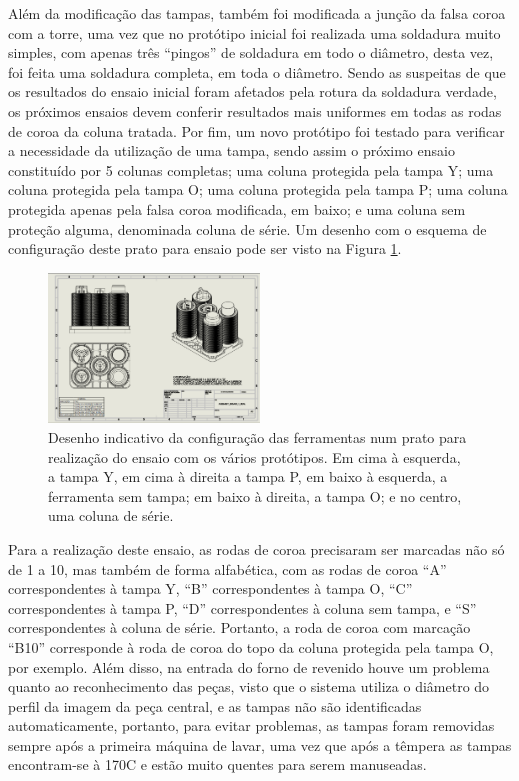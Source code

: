 \par
Além da modificação das tampas, também foi modificada a junção da falsa coroa com a torre, uma vez que no protótipo inicial foi realizada uma soldadura muito simples, com apenas três “pingos” de soldadura em todo o diâmetro, desta vez, foi feita uma soldadura completa, em toda o diâmetro. Sendo as suspeitas de que os resultados do ensaio inicial foram afetados pela rotura da soldadura verdade, os próximos ensaios devem conferir resultados mais uniformes em todas as rodas de coroa da coluna tratada. Por fim, um novo protótipo foi testado para verificar a necessidade da utilização de uma tampa, sendo assim o próximo ensaio constituído por 5 colunas completas; uma coluna protegida pela tampa Y; uma coluna protegida pela tampa O; uma coluna protegida pela tampa P; uma coluna protegida apenas pela falsa coroa modificada, em baixo; e uma coluna sem proteção alguma, denominada coluna de série. Um desenho com o esquema de configuração deste prato para ensaio pode ser visto na Figura \ref{fig:configuracao_ensaio}.
\begin{figure}[htb!]
    \centering
    \includegraphics[width = 0.5\textwidth]{Figures/Cap3/Esquema_Prato_Ensaio_08-05-2023.png}
    \caption[Desenho com a configuração do ensaio dos vários protótipos]%
    {Desenho indicativo da configuração das ferramentas num prato para realização do ensaio com os vários protótipos. Em cima à esquerda, a tampa Y, em cima à direita a tampa P, em baixo à esquerda, a ferramenta sem tampa; em baixo à direita, a tampa O; e no centro, uma coluna de série.}
    \label{fig:configuracao_ensaio}
\end{figure}
\newpage
\par
Para a realização deste ensaio, as rodas de coroa precisaram ser marcadas não só de 1 a 10, mas também de forma alfabética, com as rodas de coroa “A” correspondentes à tampa Y, “B” correspondentes à tampa O, “C” correspondentes à tampa P, “D” correspondentes à coluna sem tampa, e “S” correspondentes à coluna de série. Portanto, a roda de coroa com marcação “B10” corresponde à roda de coroa do topo da coluna protegida pela tampa O, por exemplo. Além disso, na entrada do forno de revenido houve um problema quanto ao reconhecimento das peças, visto que o sistema utiliza o diâmetro do perfil da imagem da peça central, e as tampas não são identificadas automaticamente, portanto, para evitar problemas, as tampas foram removidas sempre após a primeira máquina de lavar, uma vez que após a têmpera as tampas encontram-se à 170\textdegree C e estão muito quentes para serem manuseadas.
